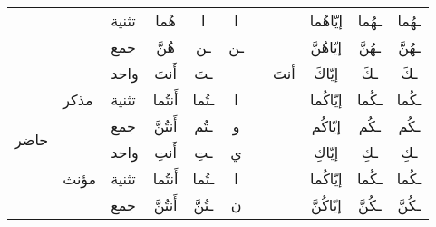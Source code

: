 \documentclass[../main.tex]{subfiles}
\begin{document}
\begin{table}[H]
\begin{tabular}{lll|ccccc|cc|c|}
\multicolumn{1}{|l|}{}                      & \multicolumn{1}{l|}{}                      & تثنية & \multicolumn{1}{c|}{هُما}                   & \multicolumn{1}{c|}{ا}      & \multicolumn{1}{c|}{ا}     & \multicolumn{1}{c|}{}    &       & \multicolumn{1}{c|}{إيّاهُما}  & ـهُما  & ـهُما  \\ \cline{3-11} 
\multicolumn{1}{|l|}{}                      & \multicolumn{1}{l|}{}                      & جمع   & \multicolumn{1}{c|}{هُنَّ}                  & \multicolumn{1}{c|}{ـن}     & \multicolumn{1}{c|}{ـن}    & \multicolumn{1}{c|}{}    &       & \multicolumn{1}{c|}{إيّاهُنَّ} & ـهُنَّ & ـهُنَّ \\ \hline
\multicolumn{1}{|l|}{\multirow{6}{*}{حاضر}} & \multicolumn{1}{l|}{\multirow{3}{*}{مذكر}} & واحد  & \multicolumn{1}{c|}{أَنتَ}                  & \multicolumn{1}{c|}{ـتَ}    & \multicolumn{1}{c|}{}      & \multicolumn{1}{c|}{}    & أنتَ  & \multicolumn{1}{c|}{إيّاكَ}    & ـكَ    & ـكَ    \\ \cline{3-11} 
\multicolumn{1}{|l|}{}                      & \multicolumn{1}{l|}{}                      & تثنية & \multicolumn{1}{c|}{أَنتُما}                & \multicolumn{1}{c|}{ـتُما}  & \multicolumn{1}{c|}{ا}     & \multicolumn{1}{c|}{}    &       & \multicolumn{1}{c|}{إيّاكُما}  & ـكُما  & ـكُما  \\ \cline{3-11} 
\multicolumn{1}{|l|}{}                      & \multicolumn{1}{l|}{}                      & جمع   & \multicolumn{1}{c|}{أَنتُنَّ}               & \multicolumn{1}{c|}{ـتُم}   & \multicolumn{1}{c|}{و}     & \multicolumn{1}{c|}{}    &       & \multicolumn{1}{c|}{إيّاكُم}   & ـكُم   & ـكُم   \\ \cline{2-11} 
\multicolumn{1}{|l|}{}                      & \multicolumn{1}{l|}{\multirow{3}{*}{مؤنث}} & واحد  & \multicolumn{1}{c|}{أَنتِ}                  & \multicolumn{1}{c|}{ـتِ}    & \multicolumn{1}{c|}{ي}     & \multicolumn{1}{c|}{}    &       & \multicolumn{1}{c|}{إيّاكِ}    & ـكِ    & ـكِ    \\ \cline{3-11} 
\multicolumn{1}{|l|}{}                      & \multicolumn{1}{l|}{}                      & تثنية & \multicolumn{1}{c|}{أَنتُما}                & \multicolumn{1}{c|}{ـتُما}  & \multicolumn{1}{c|}{ا}     & \multicolumn{1}{c|}{}    &       & \multicolumn{1}{c|}{إيّاكُما}  & ـكُما  & ـكُما  \\ \cline{3-11} 
\multicolumn{1}{|l|}{}                      & \multicolumn{1}{l|}{}                      & جمع   & \multicolumn{1}{c|}{أَنتُنَّ}               & \multicolumn{1}{c|}{ـتُنَّ} & \multicolumn{1}{c|}{ن}     & \multicolumn{1}{c|}{}    &       & \multicolumn{1}{c|}{إيّاكُنَّ} & ـكُنَّ & ـكُنَّ \\ \hline

\end{tabular}
\end{table}
\end{document}

